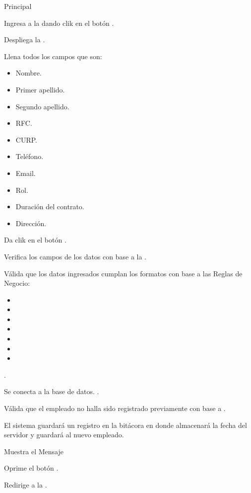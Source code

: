 	\begin{UCtrayectoria}{Principal}
	
		\UCpaso[\UCactor] Ingresa a la  dando clik en el botón . 
		
		\UCpaso Despliega la .

		\UCpaso[\UCactor] Llena todos los campos que son: 
			\begin{itemize}
				\item Nombre.
				\item Primer apellido.
				\item Segundo apellido.
				\item RFC.
				\item CURP.
				\item Teléfono.
				\item Email.
				\item Rol.
				\item Duración del contrato.
				\item Dirección.
			\end{itemize} 
		\label{CU16RegistrarEmpleado}

		\UCpaso[\UCactor] Da clik en el botón .\label{CU16ConectarBaseDatos}

		\UCpaso Verifica los campos de los datos con base a la  .

		\UCpaso Válida que los datos ingresados cumplan los formatos con base a las Reglas de Negocio: 
				
			\begin{itemize}
				\item	{} 
				\item	{} 
				\item	{} 
				\item	{} 
				\item	{} 
				\item	{} 
				\item	{} 
			\end{itemize} 
		.
		
		\UCpaso Se conecta a la base de datos. .

		\UCpaso Válida que el empleado no halla sido registrado previamente con base a  .

		\UCpaso El sistema guardará un registro en la bitácora en donde almacenará la fecha del servidor y guardará al nuevo empleado.

		\UCpaso Muestra el Mensaje 

		\UCpaso[\UCactor] Oprime el botón .

		\UCpaso Redirige a la .
		

	\end{UCtrayectoria}




